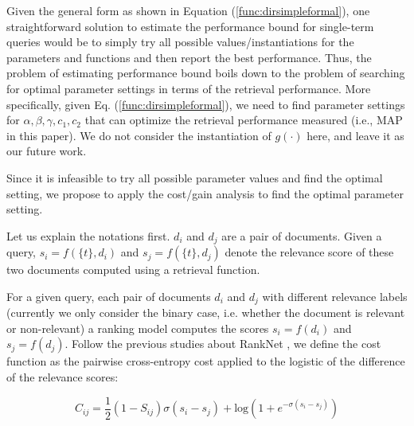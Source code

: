 Given the general form as shown in Equation (\ref{func:dirsimpleformal}), 
one straightforward solution to estimate the performance bound for single-term 
queries would be to simply try all possible values/instantiations for the parameters
and functions and then report the best performance. Thus, the problem of estimating
performance bound boils down to the problem of searching for optimal 
parameter settings in terms of the retrieval performance. 
More specifically, given Eq. (\ref{func:dirsimpleformal}), we need to 
find parameter settings for $\alpha, \beta, \gamma, c_1, c_2$ that 
can optimize the retrieval performance measured (i.e., MAP in this paper). 
We do not consider the instantiation of $g(\cdot)$ here, and leave it 
as our future work. 

Since it is infeasible to try all possible parameter values and find the optimal 
setting, we propose to apply the cost/gain analysis to find the optimal 
parameter setting. 

Let us explain the notations first.  $d_i$ and $d_j$ are a pair of 
documents.  Given a query, $s_i=f(\{t\},d_i)$ and $s_j=f(\{t\},d_j)$
denote the relevance score of these two documents computed using a 
retrieval function. 

For a given query, each pair of documents $d_i$ and $d_j$ with 
different relevance labels (currently we only consider the binary case, 
i.e. whether the document is relevant or non-relevant) a ranking model 
computes the scores $s_i=f(d_i)$ and $s_j=f(d_j)$. 
Follow the previous studies about RankNet \cite{export:68133,export:132652}, we 
define the cost function as the pairwise cross-entropy cost applied to 
the logistic of the difference of the relevance scores: 

\begin{equation}
\label{eq:cost}
C_{ij}=\frac{1}{2}(1-S_{ij})\sigma(s_i-s_j)+\mathrm{log}(1+e^{-\sigma(s_i-s_j)})
\end{equation} 

